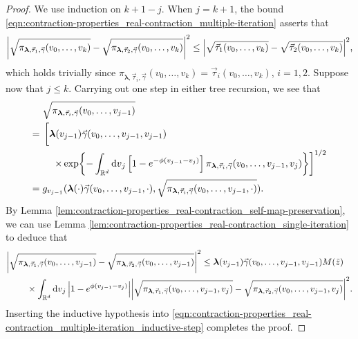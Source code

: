 \documentclass[11pt]{article}
\newcommand{\R}{\mathbb R}
\newcommand{\bl}{\bm{\lambda}}
\newcommand{\tz}{\tilde{z}}
\numberwithin{equation}{section}
\theoremstyle{plain}
\theoremstyle{definition}
\theoremstyle{remark}
\begin{document}
\begin{proof}
We use induction on $k+1-j$.
When $j=k+1$, the bound \eqref{eqn:contraction-properties_real-contraction_multiple-iteration} asserts that 
\begin{equation}
\abs{\sqrt{\pi_{\bl,\vec{\tau}_{1},\vec{\gamma}}(v_{0},\dots,v_{k})}
-\sqrt{\pi_{\bl,\vec{\tau}_{2},\vec{\gamma}}(v_{0},\dots,v_{k})}}^{2}
\le \abs{\sqrt{\vec{\tau}_{1}(v_{0},\dots,v_{k})}-\sqrt{\vec{\tau}_{2}(v_{0},\dots,v_{k})}}^{2},
\end{equation}
which holds trivially since $\pi_{\bl,\vec{\tau}_{i},\vec{\gamma}}(v_{0},\dots,v_{k})=\vec{\tau}_{i}(v_{0},\dots,v_{k})$, $i=1,2$.
Suppose now that $j\le k$.
Carrying out one step in either tree recursion, we see that
\begin{equation}
\begin{split}
{}&\sqrt{\pi_{\bl,\vec{\tau}_{i},\vec{\gamma}}(v_{0},\dots,v_{j-1})}
\\
={}&
\begin{multlined}[t]
\left[\bl(v_{j-1})\vec{\gamma}(v_{0},\dots,v_{j-1},v_{j-1})
\vphantom{\times\exp{-\int_{\R^{d}}\dd{v}_{j}\left[1-e^{-\phi(v_{j-1}-v_{j})}\right]\pi_{\bl,\vec{\tau}_{i},\vec{\gamma}}(v_{0},\dots,v_{j-1},v_{j})}}
\right.
\\
\left.\times\exp{-\int_{\R^{d}}\dd{v}_{j}\left[1-e^{-\phi(v_{j-1}-v_{j})}\right]\pi_{\bl,\vec{\tau}_{i},\vec{\gamma}}(v_{0},\dots,v_{j-1},v_{j})}\right]^{1/2}
\end{multlined}
\\
={}&g_{v_{j-1}}(\bl(\cdot)\vec{\gamma}(v_{0},\dots,v_{j-1},\cdot),\sqrt{\pi_{\bl,\vec{\tau}_{i},\vec{\gamma}}(v_{0},\dots,v_{j-1},\cdot)}).
\end{split}
\end{equation}
By Lemma \ref{lem:contraction-properties_real-contraction_self-map-preservation}, we can use Lemma \ref{lem:contraction-properties_real-contraction_single-iteration} to deduce that
\begin{equation}
\label{eqn:contraction-properties_real-contraction_multiple-iteration_inductive-step}
\begin{multlined}
\abs{\sqrt{\pi_{\bl,\vec{\tau}_{1},\vec{\gamma}}(v_{0},\dots,v_{j-1})}
-\sqrt{\pi_{\bl,\vec{\tau}_{2},\vec{\gamma}}(v_{0},\dots,v_{j-1})}}^{2}
\le \bl(v_{j-1})
\vec{\gamma}(v_{0},\dots,v_{j-1},v_{j-1})
M(\tz)
\\
\times
\int_{\R^{d}}\dd{v}_{j}\abs{1-e^{\phi(v_{j-1}-v_{j})}}
\abs{\sqrt{\pi_{\bl,\vec{\tau}_{1},\vec{\gamma}}(v_{0},\dots,v_{j-1},v_{j})}
-\sqrt{\pi_{\bl,\vec{\tau}_{2},\vec{\gamma}}(v_{0},\dots,v_{j-1},v_{j})}}^{2}.
\end{multlined}
\end{equation}
Inserting the inductive hypothesis into \eqref{eqn:contraction-properties_real-contraction_multiple-iteration_inductive-step} completes the proof.
\end{proof}
\end{document}

